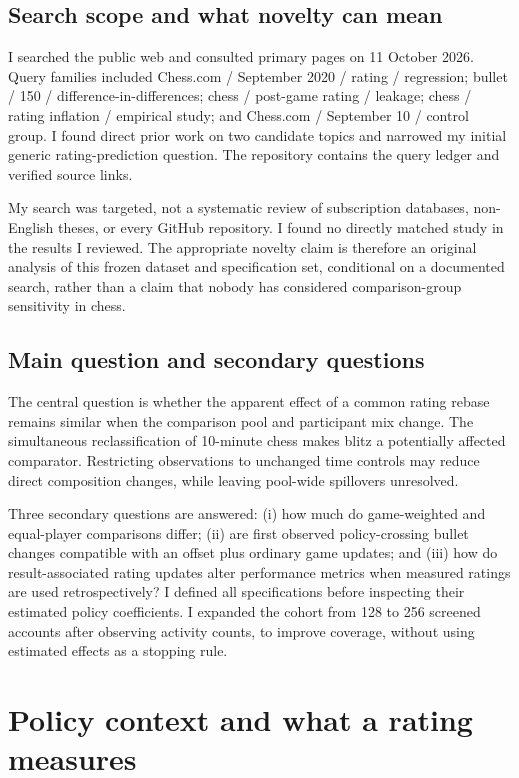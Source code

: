 \documentclass[11pt,a4paper]{article}
\begin{document}
\subsection{Search scope and what novelty can mean}

I searched the public web and consulted primary pages on 11 October 2026. Query families included Chess.com / September 2020 / rating / regression; bullet / 150 / difference-in-differences; chess / post-game rating / leakage; chess / rating inflation / empirical study; and Chess.com / September 10 / control group. I found direct prior work on two candidate topics and narrowed my initial generic rating-prediction question. The repository contains the query ledger and verified source links.

My search was targeted, not a systematic review of subscription databases, non-English theses, or every GitHub repository. I found no directly matched study in the results I reviewed. The appropriate novelty claim is therefore an original analysis of this frozen dataset and specification set, conditional on a documented search, rather than a claim that nobody has considered comparison-group sensitivity in chess.

\subsection{Main question and secondary questions}

The central question is whether the apparent effect of a common rating rebase remains similar when the comparison pool and participant mix change. The simultaneous reclassification of 10-minute chess makes blitz a potentially affected comparator. Restricting observations to unchanged time controls may reduce direct composition changes, while leaving pool-wide spillovers unresolved.

Three secondary questions are answered: (i) how much do game-weighted and equal-player comparisons differ; (ii) are first observed policy-crossing bullet changes compatible with an offset plus ordinary game updates; and (iii) how do result-associated rating updates alter performance metrics when measured ratings are used retrospectively? I defined all specifications before inspecting their estimated policy coefficients. I expanded the cohort from 128 to 256 screened accounts after observing activity counts, to improve coverage, without using estimated effects as a stopping rule.

\section{Policy context and what a rating measures}
\end{document}
